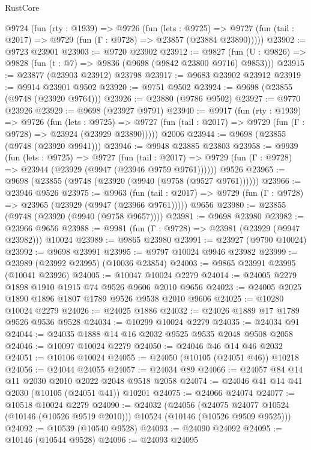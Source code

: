 \begin{lexlean}{RustCore}
\begin{coremodule}
  @9724
    (fun (rty : @1939) =>
    @9726
      (fun (lets : @9725) =>
      @9727 (fun (tail : @2017) => @9729 (fun (Γ : @9728) => @23857 (@23884 @23890)))))
@23902 := @9723 @23901
@23903 := @9720 @23902
@23912 := @9827
    (fun (U : @9826) => @9828 (fun (t : @7) => @9836 (@9698 (@9842 @23800 @9716) @9853)))
@23915 := @23877 (@23903 @23912) @23798
@23917 := @9683 @23902 @23912
@23919 := @9914 @23901 @9502
@23920 := @9751 @9502
@23924 := @9698 (@23855 (@9748 (@23920 @9764)))
@23926 := @23880 (@9786 @9502)
@23927 := @9770 @23926
@23929 := @9698 (@23927 @9791)
@23940 := @9917
    (fun (rty : @1939) =>
    @9726
      (fun (lets : @9725) =>
      @9727 (fun (tail : @2017) => @9729 (fun (Γ : @9728) => @23924 (@23929 @23890)))))
    @2006
@23944 := @9698 (@23855 (@9748 (@23920 @9941)))
@23946 := @9948 @23885 @23803
@23958 := @9939
    (fun (lets : @9725) =>
    @9727
      (fun (tail : @2017) =>
      @9729 (fun (Γ : @9728) => @23944 (@23929 (@9947 (@23946 @9759 @9761))))))
    @9526
@23965 := @9698 (@23855 (@9748 (@23920 (@9940 (@9758 (@9527 @9761))))))
@23966 := @23946 @9526
@23975 := @9963
    (fun (tail : @2017) => @9729 (fun (Γ : @9728) => @23965 (@23929 (@9947 (@23966 @9761)))))
    @9656
@23980 := @23855 (@9748 (@23920 (@9940 (@9758 @9657))))
@23981 := @9698 @23980
@23982 := @23966 @9656
@23988 := @9981 (fun (Γ : @9728) => @23981 (@23929 (@9947 @23982))) @10024
@23989 := @9865 @23980
@23991 := @23927 (@9790 @10024)
@23992 := @9698 @23991
@23995 := @9797 @10024 @9946 @23982
@23999 := @23989 (@23992 @23995) (@10036 @23854)
@24003 := @9865 @23991 @23995 (@10041 @23926)
@24005 := @10047 @10024 @2279
@24014 := @24005 @2279 @1898 @1910 @1915 @74 @9526 @9606 @2010 @9656
@24023 := @24005 @2025 @1890 @1896 @1807 @1789 @9526 @9538 @2010 @9606
@24025 := @10280 @10024 @2279
@24026 := @24025 @1886
@24032 := @24026 @1889 @17 @1789 @9526 @9536 @9528
@24034 := @10299 @10024 @2279
@24035 := @24034 @91
@24044 := @24035 @1888 @14 @16 @2032 @9525 @9535 @2048 @9508 @2058
@24046 := @10097 @10024 @2279
@24050 := @24046 @46 @14 @46 @2032
@24051 := @10106 @10024
@24055 := @24050 (@10105 (@24051 @46)) @10218
@24056 := @24044 @24055
@24057 := @24034 @89
@24066 := @24057 @84 @14 @11 @2030 @2010 @2022 @2048 @9518 @2058
@24074 := @24046 @41 @14 @41 @2030 (@10105 (@24051 @41)) @10201
@24075 := @24066 @24074
@24077 := @10518 @10024 @2279
@24090 := @24032
    (@24056
      (@24075 @24077 @10524 (@10146 (@10526 @9519 @2010)))
      @10524
      (@10146 (@10526 @9509 @9525)))
@24092 := @10539 (@10540 @9528)
@24093 := @24090 @24092
@24095 := @10146 (@10544 @9528)
@24096 := @24093 @24095

\end{coremodule}
\end{lexlean}
